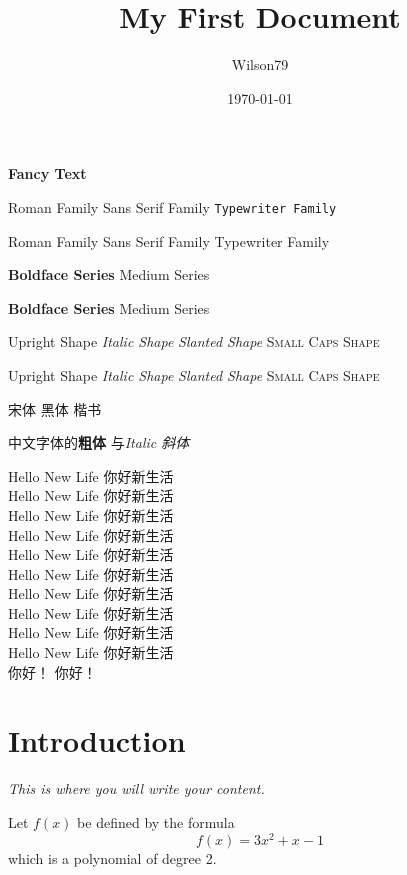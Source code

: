 \documentclass[10pt]{article} %
\title{My First Document}
\author{Wilson79}
\date{\today}
\newcommand{\myfont} {\textbf{\textsf{Fancy Text}}}
\begin{document}
 
	\myfont

	\textrm{Roman Family} 
	\textsf{Sans Serif Family}
	\texttt{Typewriter Family}

	\rmfamily Roman Family
	\sffamily Sans Serif Family
	{\ttfamily Typewriter Family}

	\textbf{Boldface Series}
	\textmd{Medium Series}

	{\bfseries Boldface Series}
	{\mdseries Medium Series}

	
	
	\textup{Upright Shape} \textit{Italic Shape}
	\textsl{Slanted Shape} \textsc{Small Caps Shape}

	{\upshape Upright Shape} {\itshape Italic Shape} 
	{\slshape Slanted Shape} {\scshape Small Caps Shape}

	{\songti 宋体} {\heiti 黑体} 
	{\kaishu 楷书}

	中文字体的\textbf{粗体 }与\textit{Italic 斜体} 


	{\tiny Hello New Life 你好新生活} \\
	{\scriptsize Hello New Life 你好新生活} \\
	{\footnotesize Hello New Life 你好新生活} \\
	{\small Hello New Life 你好新生活} \\
	{\normalsize Hello New Life 你好新生活} \\
	{\large Hello New Life 你好新生活} \\
	{\Large Hello New Life 你好新生活} \\
	{\LARGE Hello New Life 你好新生活} \\
	{\huge Hello New Life 你好新生活} \\
	{\Huge Hello New Life 你好新生活} \\

	 你好！
	 你好！




	\section{Introduction} 

	{\ttfamily \itshape This is where you will write your content. }


	\rmfamily Let $f(x)$ be defined by the formula $$f(x)=3x^2+x-1$$ which is a polynomial of degree 2.
\end{document}
